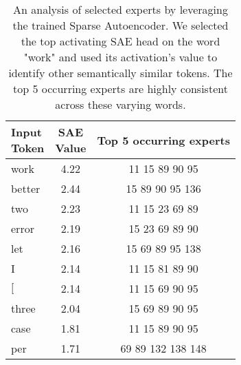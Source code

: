 \begin{table}[]
    \centering
    \begin{tabular}{lcc}
        \makecell{Input \\ Token} & \makecell{SAE \\ Value}  & Top 5 occurring experts \\
        \toprule
         work & 4.22 & 11 \hfill 15 \hfill 89 \hfill 90 \hfill 95 \\
         better & 2.44 & 15 \hfill 89 \hfill 90 \hfill 95 \hfill 136 \\
         two & 2.23 & 11 \hfill 15 \hfill 23 \hfill 69 \hfill 89 \\
         error & 2.19 & 15 \hfill 23 \hfill 69 \hfill 89 \hfill 90 \\
         let & 2.16 & 15 \hfill 69 \hfill 89 \hfill 95 \hfill 138 \\
         I & 2.14 & 11 \hfill 15 \hfill 81 \hfill 89 \hfill 90 \\
         $[$ & 2.14 & 11 \hfill 15 \hfill 69 \hfill 90 \hfill 95 \\
         three & 2.04 & 15 \hfill 69 \hfill 89 \hfill 90 \hfill 95 \\
         case & 1.81 & 11 \hfill 15 \hfill 89 \hfill 90 \hfill 95 \\
         per & 1.71 & 69 \hfill 89 \hfill 132 \hfill 138 \hfill 148 \\
        \bottomrule
    \end{tabular}
    \caption{An analysis of selected experts by leveraging the trained Sparse Autoencoder. We selected the top activating SAE head on the word "work" and used its activation's value to identify other semantically similar tokens. The top 5 occurring experts are highly consistent across these varying words.}
    \label{tab:sae_work}
\end{table}

